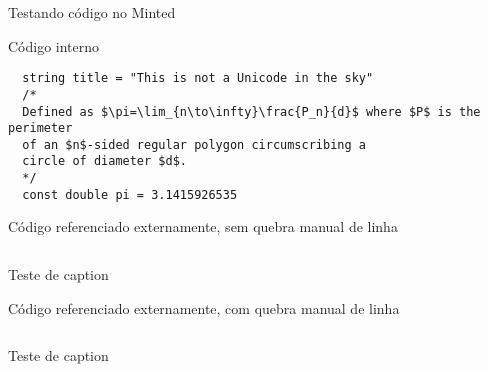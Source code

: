 \documentclass[a4paper,12pt,brazil,doubleside]{book}
\begin{document}
\lstset{ %
 breakatwhitespace=false,
 breaklines=true
}

Testando código no Minted


Código interno
\begin{listing}
\begin{verbatim}
  string title = "This is not a Unicode in the sky"
  /*
  Defined as $\pi=\lim_{n\to\infty}\frac{P_n}{d}$ where $P$ is the perimeter
  of an $n$-sided regular polygon circumscribing a
  circle of diameter $d$.
  */
  const double pi = 3.1415926535
\end{verbatim}
\end{listing}

Código referenciado externamente, sem quebra manual de linha
\begin{listing}
\inputminted[linenos=true,bgcolor=bg]{java}{src/teste2.java}
\label{AndroidManifest.sdk}
\caption{Teste de caption}
\end{listing}

Código referenciado externamente, com quebra manual de linha
\begin{listing}
\inputminted[linenos=true,bgcolor=bg]{java}{src/teste.java}
\label{AndroidManifest.sdk}
\caption{Teste de caption}
\end{listing}
\end{document}
